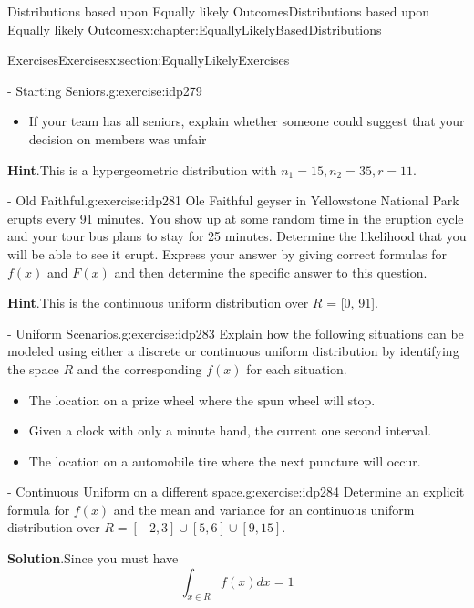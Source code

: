 \documentclass[oneside,10pt,]{book}
\newcommand{\blocktitlefont}{\relax}
\numberwithin{equation}{section}
\begin{document}
\begin{chapterptx}{Distributions based upon Equally likely Outcomes}{}{Distributions based upon Equally likely Outcomes}{}{}{x:chapter:EquallyLikelyBasedDistributions}
\begin{sectionptx}{Exercises}{}{Exercises}{}{}{x:section:EquallyLikelyExercises}
\begin{inlineexercise}{- Starting Seniors.}{g:exercise:idp279}
\begin{itemize}[label=\textbullet]
\item{}If your team has all seniors, explain whether someone could suggest that your decision on members was unfair%
\end{itemize}
%
\par\smallskip%
\noindent\textbf{\blocktitlefont Hint}.\hypertarget{g:hint:idp280}{}\quad{}This is a hypergeometric distribution with \(n_1 = 15, n_2 = 35, r = 11\).%
\end{inlineexercise}%
\begin{inlineexercise}{- Old Faithful.}{g:exercise:idp281}%
Ole Faithful geyser in Yellowstone National Park erupts every 91 minutes. You show up at some random time in the eruption cycle and your tour bus plans to stay for 25 minutes. Determine the likelihood that you will be able to see it erupt.  Express your answer by giving correct formulas for \(f(x)\) and \(F(x)\) and then determine the specific answer to this question.%
\par\smallskip%
\noindent\textbf{\blocktitlefont Hint}.\hypertarget{g:hint:idp282}{}\quad{}This is the continuous uniform distribution over \(R\) = [0, 91].%
\end{inlineexercise}%
\begin{inlineexercise}{- Uniform Scenarios.}{g:exercise:idp283}%
Explain how the following situations can be modeled using either a discrete or continuous uniform distribution by identifying the space \(R\) and the corresponding \(f(x)\) for each situation.%
\begin{itemize}[label=\textbullet]
\item{}The location on a prize wheel where the spun wheel will stop.%
\item{}Given a clock with only a minute hand, the current one second interval.%
\item{}The location on a automobile tire where the next puncture will occur.%
\end{itemize}
%
\end{inlineexercise}%
\begin{inlineexercise}{- Continuous Uniform on a different space.}{g:exercise:idp284}%
Determine an explicit formula for \(f(x)\) and the mean and variance for an continuous uniform distribution over \(R = [-2,3] \cup [5,6] \cup [9,15]\).%
\par\smallskip%
\noindent\textbf{\blocktitlefont Solution}.\hypertarget{g:solution:idp285}{}\quad{}Since you must have%
\begin{equation*}
\int_{x \in R} f(x) dx = 1
\end{equation*}

\end{inlineexercise}
\end{sectionptx}
\end{chapterptx}
\end{document}

